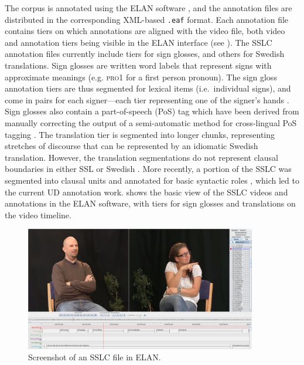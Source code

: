 \documentclass[11pt]{article}
\begin{document}
The corpus is annotated using the ELAN software \cite{Wittenburg2006elan}, and the annotation files are distributed in the corresponding XML-based \texttt{.eaf} format. Each annotation file contains tiers on which annotations are aligned with the video file, both video and annotation tiers being visible in the ELAN interface (see ). The SSLC annotation files currently include tiers for sign glosses, and others for Swedish translations. Sign glosses are written word labels that represent signs with approximate meanings (e.g. \textsc{pro1} for a first person pronoun). The sign gloss annotation tiers are thus segmented for lexical items (i.e.~individual signs), and come in pairs for each signer---each tier representing one of the signer's hands \cite{Mesch2015gloss}. Sign glosses also contain a part-of-speech (PoS) tag which have been derived from manually correcting the output of a semi-automatic method for cross-lingual PoS tagging \cite{Ostling2015enriching}. The translation tier is segmented into longer chunks, representing stretches of discourse that can be represented by an idiomatic Swedish translation. However, the translation segmentations do not represent clausal boundaries in either SSL or Swedish \cite{Borstell2014segmenting}. More recently, a portion of the SSLC was segmented into clausal units and annotated for basic syntactic roles \cite{Borstell2016syntactic}, which led to the current UD annotation work.  shows the basic view of the SSLC videos and annotations in the ELAN software, with tiers for sign glosses and translations on the video timeline.

\begin{figure}[p]
	\centering
	\includegraphics[width=0.9\textwidth]{sslc_elan.png}
	\caption{Screenshot of an SSLC file in ELAN.}
	\label{fig:sslc_elan}
\end{figure}
\end{document}

